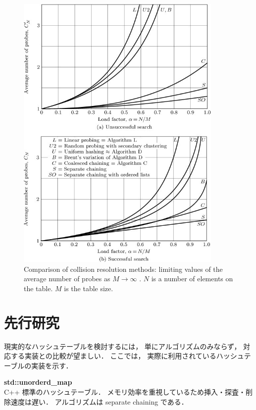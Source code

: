 \begin{figure} %
  \centering
  \includegraphics[width=10cm]{./fig/taocp_v3_fig44.png}
  \caption{
    Comparison of collision resolution methods: limiting values of the average number of probes as $M \rightarrow \infty$ \citep{knuth1998}.
    $N$ is a number of elements on the table. $M$ is the table size.
  }
  \label{fig_taocp_v3_fig44}
\end{figure}


\section{先行研究}
現実的なハッシュテーブルを検討するには，
単にアルゴリズムのみならず，
対応する実装との比較が望ましい．
ここでは，
実際に利用されているハッシュテーブルの実装を示す．
\leavevmode \newline

{\bf std::unorderd\_map}
\samepage \\ \indent
C++ 標準のハッシュテーブル．
メモリ効率を重視しているため挿入・探査・削除速度は遅い．
アルゴリズムは separate chaining である．
\\

